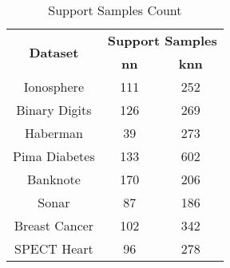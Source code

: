 \begin{table}[htbp]
\caption{Support Samples Count}
\begin{center}
\begin{tabular}{|c|c|c|}
\hline
\multirow{2}{*}{\textbf{Dataset}} & \multicolumn{2}{c|}{\textbf{Support Samples}} \\ \cline{2-3}
 & \textbf{nn} & \textbf{knn} \\ \hline
Ionosphere & 111 & 252 \\ \hline
Binary Digits & 126 & 269 \\ \hline
Haberman & 39 & 273 \\ \hline
Pima Diabetes & 133 & 602 \\ \hline
Banknote & 170 & 206 \\ \hline
Sonar & 87 & 186 \\ \hline
Breast Cancer & 102 & 342 \\ \hline
SPECT Heart & 96 & 278 \\ \hline
\end{tabular}
\label{tab:support}
\end{center}
\end{table}